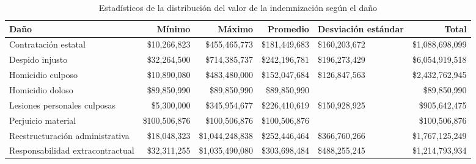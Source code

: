 \begin{sidewaystable}[htbp]
\centering
\caption{Estadísticos de la distribución del
valor de la indemnización según el daño} 
\label{tab:indemdano}
\begin{tabular}{lrrrR{2.5cm}r}
  \hline
Daño & Mínimo & Máximo & Promedio & Desviación estándar & Total \\ 
  \hline
Contratación estatal & \$10,266,823 & \$455,465,773 & \$181,449,683 & \$160,203,672 & \$1,088,698,099 \\ 
  Despido injusto & \$32,264,500 & \$714,385,737 & \$242,196,781 & \$196,273,429 & \$6,054,919,518 \\ 
  Homicidio culposo & \$10,890,080 & \$483,480,000 & \$152,047,684 & \$126,847,563 & \$2,432,762,945 \\ 
  Homicidio doloso & \$89,850,990 & \$89,850,990 & \$89,850,990 &  & \$89,850,990 \\ 
  Lesiones personales culposas & \$5,300,000 & \$345,954,677 & \$226,410,619 & \$150,928,925 & \$905,642,475 \\ 
  Perjuicio material & \$100,506,876 & \$100,506,876 & \$100,506,876 &  & \$100,506,876 \\ 
  Reestructuración administrativa & \$18,048,323 & \$1,044,248,838 & \$252,446,464 & \$366,760,266 & \$1,767,125,249 \\ 
  Responsabilidad extracontractual & \$32,311,255 & \$1,035,490,080 & \$303,698,484 & \$488,255,245 & \$1,214,793,934 \\ 
   \hline
\end{tabular}
\end{sidewaystable}
